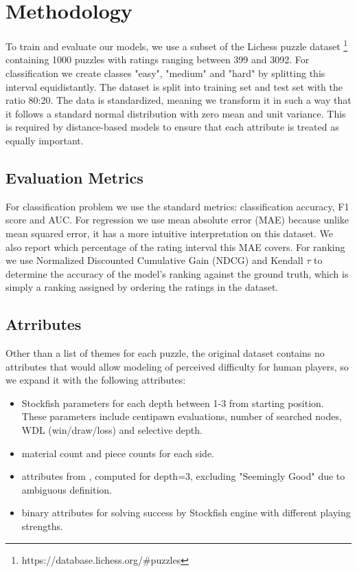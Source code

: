 \documentclass[sigconf,nonacm]{acmart}
\begin{document}
\section{Methodology}

To train and evaluate our models, we use a subset of the Lichess puzzle dataset \footnote{https://database.lichess.org/\#puzzles} containing 1000 puzzles with ratings ranging between 399 and 3092. For classification we create classes "easy", "medium" and "hard" by splitting this interval equidistantly. The dataset is split into training set and test set with the ratio 80:20. The data is standardized, meaning we transform it in such a way that it follows a standard normal distribution with zero mean and unit variance. This is required by distance-based models to ensure that each attribute is treated as equally important. 

\subsection{Evaluation Metrics}

For classification problem we use the standard metrics: classification accuracy, F1 score and AUC. For regression we use mean absolute error (MAE) because unlike mean squared error, it has a more intuitive interpretation on this dataset. We also report which percentage of the rating interval this MAE covers. For ranking we use Normalized Discounted Cumulative Gain (NDCG) and Kendall $\tau$ to determine the accuracy of the model's ranking against the ground truth, which is simply a ranking assigned by ordering the ratings in the dataset. 

\subsection{Atrributes}

Other than a list of themes for each puzzle, the original dataset contains no attributes that would allow modeling of perceived difficulty for human players, so we expand it with the following attributes:

\begin{itemize}
\item Stockfish parameters for each depth between 1-3 from starting position. These parameters include centipawn evaluations, number of searched nodes, WDL (win/draw/loss) and selective depth.
\item material count and piece counts for each side.
\item attributes from \cite{bratko3}, computed for depth=3, excluding "Seemingly Good" due to ambiguous definition. 
\item binary attributes for solving success by Stockfish engine with different playing strengths. 
\end{itemize}
\end{document}
